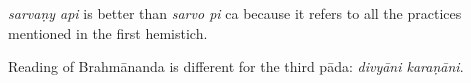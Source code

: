 \begin{ekdosis}
\begin{testimonia}[hp01_065]
\begin{versinnote}
\end{versinnote}

\end{testimonia}

\begin{philcomm}[hp01_065]
\emph{sarvaṇy api} is better than \emph{sarvo pi} ca because it refers to all the practices mentioned in the first hemistich.

Reading of Brahmānanda is different for the third pāda: \emph{divyāni karaṇāni}.
\end{philcomm}

\end{ekdosis}

